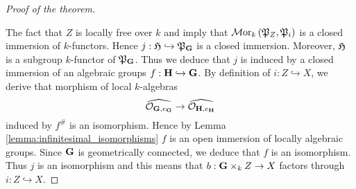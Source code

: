 \begin{proof}[Proof of the theorem]
\begin{center}
\end{center}
The fact that $Z$ is locally free over $k$ and {\cite[Theorem 6.2]{kfunctors}} imply that $\mathcal{M}\mathrm{or}_k\left({\mathfrak P}_{Z},{\mathfrak P}_{i}\right)$ is a closed immersion of $k$-functors. Hence $j:{\mathfrak H} \hookrightarrow {\mathfrak P}_{\mathbf{G}}$ is a closed immersion. Moreover, ${\mathfrak H}$ is a subgroup $k$-functor of ${\mathfrak P}_{\mathbf{G}}$. Thus we deduce that $j$ is induced by a closed immersion of an algebraic groups $f:\mathbf{H} \hookrightarrow \mathbf{G}$. By definition of $i:Z\hookrightarrow X$, we derive that morphism of local $k$-algebras
$$\widehat{{\mathcal O}_{\mathbf{G},e_{\mathbf{G}}}} \rightarrow  \widehat{{\mathcal O}_{\mathbf{H},e_{\mathbf{H}}}}$$
induced by $f^{\#}$ is an isomorphism. Hence by Lemma \ref{lemma:infinitesimal_isomorphisms} $f$ is an open immersion of locally algebraic groups. Since $\mathbf{G}$ is geometrically connected, we deduce that $f$ is an isomorphism. Thus $j$ is an isomorphism and this means that $b:\mathbf{G}\times_k Z\rightarrow X$ factors through $i:Z\hookrightarrow X$.
\end{proof}


























































\small







